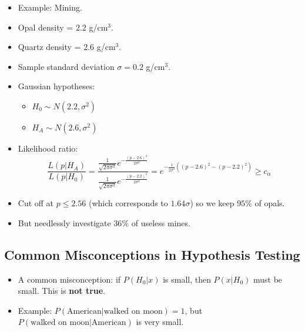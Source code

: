 \begin{itemize}
    \item Example: Mining.
    \item Opal density = $2.2$ g/cm$^3$.
    \item Quartz density = $2.6$ g/cm$^3$.
    \item Sample standard deviation $\sigma = 0.2$ g/cm$^3$.
    \item Gaussian hypotheses:
          \begin{itemize}
              \item $H_{0} \sim N(2.2, \sigma^2)$
              \item $H_{A} \sim N(2.6, \sigma^2)$
          \end{itemize}
    \item Likelihood ratio:
          \[
              \frac{L(p|H_{A})}{L(p|H_{0})}
              = \frac{ \frac{1}{\sqrt{2 \pi \sigma^2}} e^{-\frac{(p - 2.6)^2}{2 \sigma^2}} }
              { \frac{1}{\sqrt{2 \pi \sigma^2}} e^{-\frac{(p - 2.2)^2}{2 \sigma^2}}}
              = e^{-\frac{1}{2 \sigma^2} \left( (p - 2.6)^2 - (p - 2.2)^2 \right)} \geq c_{\alpha}
          \]
    \item Cut off at $p \leq 2.56$ (which corresponds to $1.64\sigma$) so we keep $95\%$ of opals.
    \item But needlessly investigate $36\%$ of useless mines.
\end{itemize}

\subsection{Common Misconceptions in Hypothesis Testing}

\begin{itemize}
    \item A common misconception: if $P(H_{0}|x)$ is small, then $P(x|H_{0})$ must be small. This is \textbf{not true}.
    \item Example: $P(\text{American} | \text{walked on moon}) = 1$, but $P(\text{walked on moon} | \text{American})$ is very small.
\end{itemize}
